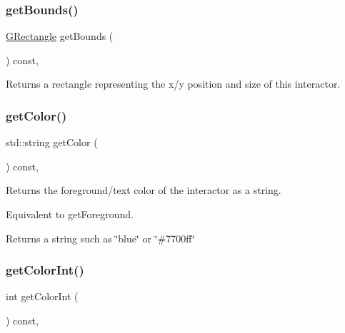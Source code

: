 \subsubsection{\texorpdfstring{get\+Bounds()}{getBounds()}}
{\footnotesize\ttfamily \mbox{\hyperlink{classGRectangle}{G\+Rectangle}} get\+Bounds (\begin{DoxyParamCaption}{ }\end{DoxyParamCaption}) const\hspace{0.3cm}{\ttfamily [virtual]}, {\ttfamily [inherited]}}



Returns a rectangle representing the x/y position and size of this interactor. 

\mbox{\label{classGInteractor_aa061dfa488c31e18549d64363c1d0e34}} 
\subsubsection{\texorpdfstring{get\+Color()}{getColor()}}
{\footnotesize\ttfamily std\+::string get\+Color (\begin{DoxyParamCaption}{ }\end{DoxyParamCaption}) const\hspace{0.3cm}{\ttfamily [virtual]}, {\ttfamily [inherited]}}



Returns the foreground/text color of the interactor as a string. 

Equivalent to get\+Foreground. \begin{DoxyReturn}{Returns}
a string such as \char`\"{}blue\char`\"{} or \char`\"{}\#7700ff\char`\"{} 
\end{DoxyReturn}
\mbox{\label{classGInteractor_a9635c7af766cdc3417f346683fa0e6c1}} 
\subsubsection{\texorpdfstring{get\+Color\+Int()}{getColorInt()}}
{\footnotesize\ttfamily int get\+Color\+Int (\begin{DoxyParamCaption}{ }\end{DoxyParamCaption}) const\hspace{0.3cm}{\ttfamily [virtual]}, {\ttfamily [inherited]}}



